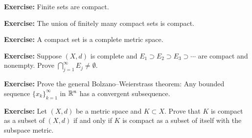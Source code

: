 \documentclass[10pt,aspectratio=169]{beamer}
\begin{document}
\begin{frame}

\textbf{Exercise:}
Finite sets are compact.

\pause
\medskip

\textbf{Exercise:}
The union of finitely many compact sets is compact.

\pause
\medskip

\textbf{Exercise:}
A compact set is a complete metric space.

\pause
\medskip

\textbf{Exercise:}
Suppose $(X,d)$ is complete and
$E_1 \supset E_2 \supset E_3 \supset \cdots$ are compact and nonempty.
Prove $\bigcap_{j=1}^\infty E_j \not= \emptyset$.


\pause
\medskip

\textbf{Exercise:}
Prove the general Bolzano--Weierstrass theorem:
Any bounded sequence $\{ x_k \}_{k=1}^\infty$ in ${\mathbb{R}}^n$
has a convergent subsequence.

\pause
\medskip

\textbf{Exercise:}
Let $(X,d)$ be a metric space and $K \subset X$.
Prove that $K$ is compact as a subset of $(X,d)$ if and only if $K$ is
compact as a subset of itself with the subspace metric.

\end{frame}
\end{document}
